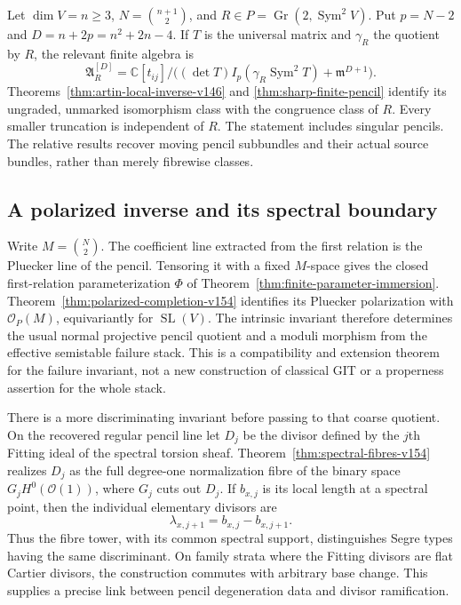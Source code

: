 \documentclass[11pt,reqno]{amsart}
\numberwithin{equation}{section}
\theoremstyle{definition}\newtheorem{definition}[theorem]{Definition}
\theoremstyle{remark}\newtheorem{remark}[theorem]{Remark}
\newcommand{\C}{\mathbb C}\newcommand{\Q}{\mathbb Q}
\newcommand{\OO}{\mathcal O}\newcommand{\II}{\mathcal I}
\DeclareMathOperator{\Sym}{Sym}\DeclareMathOperator{\Gr}{Gr}
\begin{document}
Let $\dim V=n\geq3$, $N=\binom{n+1}{2}$, and
$R\in P=\Gr(2,\Sym^2V)$. Put $p=N-2$ and
$D=n+2p=n^2+2n-4$. If $T$ is the universal matrix and $\gamma_R$
the quotient by $R$, the relevant finite algebra is
\[
 \mathfrak A_R^{[D]}=
 \C[t_{ij}]/\bigl((\det T)I_p(\gamma_R\Sym^2T)
                                      +\mathfrak m^{D+1}\bigr).
\]
Theorems~\ref{thm:artin-local-inverse-v146} and
\ref{thm:sharp-finite-pencil} identify its ungraded, unmarked
isomorphism class with the congruence class of $R$. Every smaller
truncation is independent of $R$. The statement includes singular
pencils. The relative results recover moving pencil subbundles and
their actual source bundles, rather than merely fibrewise classes.

\subsection{A polarized inverse and its spectral boundary}
Write $M=\binom N2$. The coefficient line extracted from the first
relation is the Pluecker line of the pencil. Tensoring it with a
fixed $M$-space gives the closed first-relation parameterization
$\Phi$ of Theorem~\ref{thm:finite-parameter-immersion}.
Theorem~\ref{thm:polarized-completion-v154} identifies its
Pluecker polarization with $\OO_P(M)$, equivariantly for
$\operatorname{SL}(V)$. The intrinsic invariant therefore determines
the usual normal projective pencil quotient and a moduli morphism
from the effective semistable failure stack. This is a compatibility
and extension theorem for the failure invariant, not a new
construction of classical GIT or a properness assertion for the
whole stack.

There is a more discriminating invariant before passing to that
coarse quotient. On the recovered regular pencil line let $D_j$
be the divisor defined by the $j$th Fitting ideal of the spectral
torsion sheaf. Theorem~\ref{thm:spectral-fibres-v154} realizes $D_j$
as the full degree-one normalization fibre of the binary space
$G_jH^0(\OO(1))$, where $G_j$ cuts out $D_j$. If $b_{x,j}$ is its
local length at a spectral point, then the individual elementary
divisors are
\[
                    \lambda_{x,j+1}=b_{x,j}-b_{x,j+1}.
\]
Thus the fibre tower, with its common spectral support, distinguishes
Segre types having the same discriminant. On family strata where
the Fitting divisors are flat Cartier divisors, the construction
commutes with arbitrary base change. This supplies a precise link
between pencil degeneration data and divisor ramification.
\end{document}

